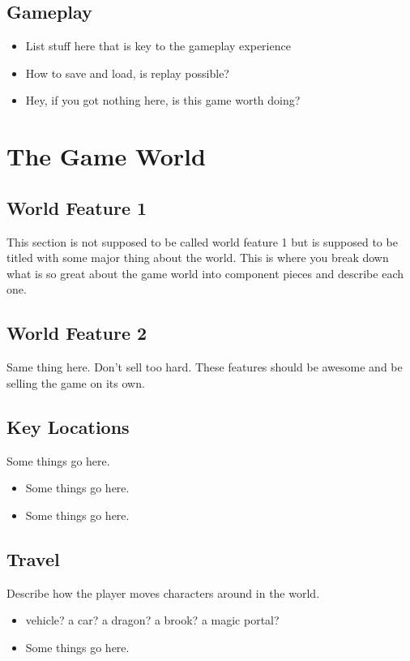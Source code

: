 \documentclass[11pt]{article}
\begin{document}
    \subsection{Gameplay}
      \begin{itemize}
          \item List stuff here that is key to the gameplay experience
          \item How to save and load, is replay possible?
          \item Hey, if you got nothing here, is this game worth doing?
      \end{itemize}

  \section{The Game World}
    \subsection{World Feature 1}
      This section is not supposed to be called world feature 1 but is supposed to be titled with some major thing about the world. This is where you break down what is so great about the game world into component pieces and describe each one.

    \subsection{World Feature 2}
      Same thing here. Don’t sell too hard. These features should be awesome and be selling the game on its own.

    \subsection{Key Locations}
      Some things go here.
      \begin{itemize}
          \item Some things go here.
          \item Some things go here.
      \end{itemize}

    \subsection{Travel}
      Describe how the player moves characters around in the world.
      \begin{itemize}
          \item vehicle? a car? a dragon? a brook? a magic portal?
          \item Some things go here.
      \end{itemize}
\end{document}
